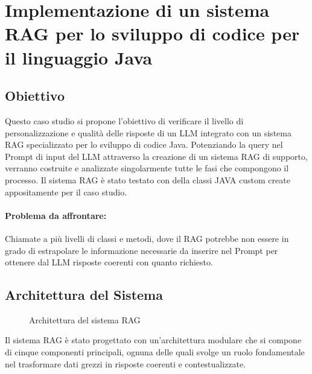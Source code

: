 \documentclass[12pt,a4paper,openright,twoside]{book}
\begin{document}
\chapter{Implementazione di un sistema RAG per lo sviluppo di codice per il linguaggio Java}
\section{Obiettivo}
Questo caso studio si propone l'obiettivo di verificare il livello di personalizzazione e qualità delle risposte di un \ac{LLM} integrato con un sistema \ac{RAG} specializzato per lo sviluppo di codice Java.
Potenziando la query nel Prompt di input del LLM attraverso la creazione di un sistema RAG di supporto,
verranno costruite e analizzate singolarmente tutte le fasi che compongono il processo.
Il sistema RAG è stato testato con della classi JAVA custom create appositamente per il caso studio.
\subsubsection{Problema da affrontare:}
Chiamate a più livelli di classi e metodi, dove il RAG potrebbe non essere in grado di estrapolare
le informazione necessarie da inserire nel Prompt per ottenere dal LLM risposte coerenti con quanto richiesto.
\section{Architettura del Sistema}
\begin{figure}[H]
    \centering
    \caption{Architettura del sistema RAG}
    \label{fig:rag-architecture}
\end{figure}
Il sistema RAG è stato progettato con un'architettura modulare che si compone di cinque componenti principali,
ognuna delle quali svolge un ruolo fondamentale nel trasformare dati grezzi in risposte coerenti e contestualizzate.
\end{document}

